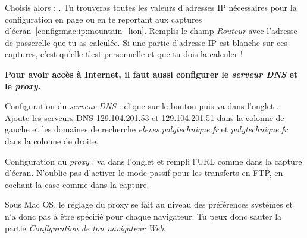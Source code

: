 Choisis alors  : . Tu trouveras toutes les valeurs d'adresses IP n\'ecessaires pour la configuration en page \pageref{calcul_ip} ou en te reportant aux captures d'\'ecran~\ref{config:mac:ip:mountain_lion}. Remplis le champ \emph{Routeur} avec l'adresse de passerelle que tu as calcul\'ee. Si une partie d'adresse IP est blanche sur ces captures, c'est qu'elle t'est personnelle et que tu dois la calculer !


  
  

\vspace{4mm}

\textbf{Pour avoir acc\`es \`a  Internet, il faut aussi configurer le \emph{serveur DNS} et le \emph{proxy}.}

Configuration du \emph{serveur DNS} : clique sur le bouton  puis va dans l'onglet . Ajoute les serveurs DNS 129.104.201.53 et 129.104.201.51 dans la colonne de gauche et les domaines de recherche \emph{eleves.polytechnique.fr} et \emph{polytechnique.fr} dans la colonne de droite.



Configuration du \emph{proxy} : va dans l'onglet  et rempli l'URL comme dans la capture d'\'ecran. N'oublie pas d'activer le mode passif pour les transferts en FTP, en cochant la case comme dans la capture.

Sous Mac OS, le r\'eglage du proxy se fait au niveau des pr\'ef\'erences syst\`emes et n'a donc pas \`a \^etre sp\'ecifi\'e pour chaque navigateur. Tu peux donc sauter la partie \emph{Configuration de ton navigateur Web}.







